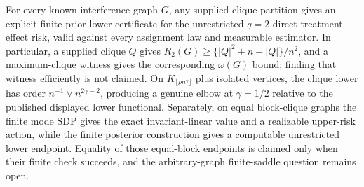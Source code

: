For every known interference graph \(G\), any supplied clique partition gives an explicit finite-prior lower certificate for the unrestricted \(q=2\) direct-treatment-effect risk, valid against every assignment law and measurable estimator.  In particular, a supplied clique \(Q\) gives \(R_2(G)\geq\{|Q|^2+n-|Q|\}/n^2\), and a maximum-clique witness gives the corresponding \(\omega(G)\) bound; finding that witness efficiently is not claimed.  On \(K_{\lfloor\rho n^{\gamma}\rfloor}\) plus isolated vertices, the clique lower has order \(n^{-1}\vee n^{2\gamma-2}\), producing a genuine elbow at \(\gamma=1/2\) relative to the published displayed lower functional.  Separately, on equal block-clique graphs the finite mode SDP gives the exact invariant-linear value and a realizable upper-risk action, while the finite posterior construction gives a computable unrestricted lower endpoint.  Equality of those equal-block endpoints is claimed only when their finite check succeeds, and the arbitrary-graph finite-saddle question remains open.
